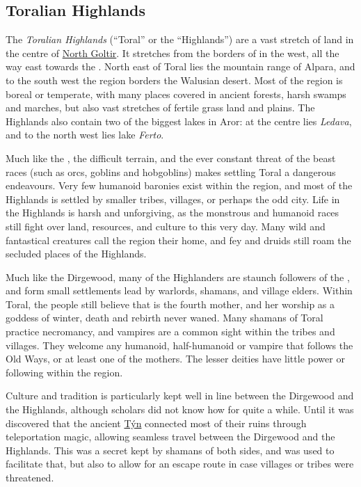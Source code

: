 \subsection{Toralian Highlands}
\label{sec:Toralian Highlands}

The \emph{Toralian Highlands} (``Toral'' or the ``Highlands'') are a vast
stretch of land in the centre of \hyperref[sec:Goltir]{North Goltir}. It
stretches from the borders of  in the west, all the way east
towards the . North east of Toral lies the
mountain range of Alpara, and to the south west the region borders the Walusian
desert. Most of the region is boreal or temperate, with many places covered
in ancient forests, harsh swamps and marches, but also vast stretches of
fertile grass land and plains. The Highlands also contain two of the biggest
lakes in Aror: at the centre lies \emph{Ledava}, and to the north west lies
lake \emph{Ferto}.

Much like the , the difficult terrain, and the ever
constant threat of the beast races (such as orcs, goblins and hobgoblins)
makes settling Toral a dangerous endeavours. Very few humanoid baronies exist
within the region, and most of the Highlands is settled by smaller tribes,
villages, or perhaps the odd city. Life in the Highlands is harsh and
unforgiving, as the monstrous and humanoid races still fight over land,
resources, and culture to this very day. Many wild and fantastical creatures
call the region their home, and fey and druids still roam the secluded places
of the Highlands.

Much like the Dirgewood, many of the Highlanders are staunch followers of
the , and form small settlements lead by warlords,
shamans, and village elders. Within Toral, the people still believe that
 is the fourth mother, and her worship as a goddess of
winter, death and rebirth never waned. Many shamans of Toral practice
necromancy, and vampires are a common sight within the tribes and villages.
They welcome any humanoid, half-humanoid or vampire that follows the Old Ways,
or at least one of the mothers. The lesser deities have little power or
following within the region.

Culture and tradition is particularly kept well in line between the Dirgewood
and the Highlands, although scholars did not know how for quite a while. Until
it was discovered that the ancient \hyperref[sec:Tynrikke]{Týn} connected most
of their ruins through teleportation magic, allowing seamless travel between
the Dirgewood and the Highlands. This was a secret kept by shamans of both
sides, and was used to facilitate that, but also to allow for an escape route
in case villages or tribes were threatened.

